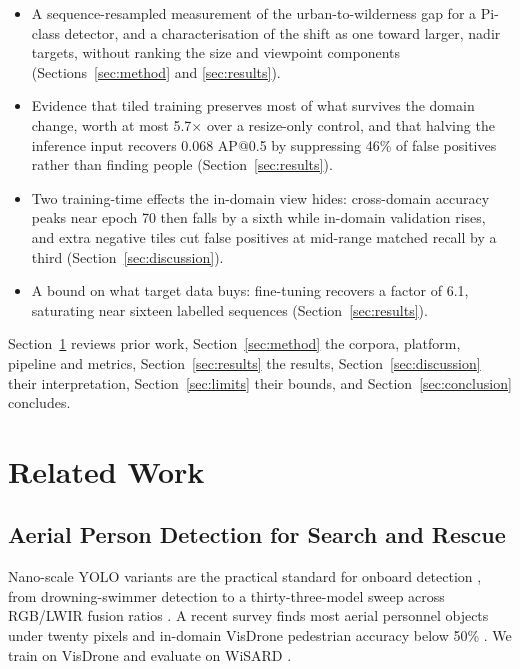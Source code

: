 \documentclass[conference]{IEEEtran}
\begin{document}
\begin{itemize}
\item A sequence-resampled measurement of the urban-to-wilderness gap for a
Pi-class detector, and a characterisation of the shift as one toward larger,
nadir targets, without ranking the size and viewpoint components
(Sections~\ref{sec:method} and \ref{sec:results}).

\item Evidence that tiled training preserves most of what survives the domain
change, worth at most 5.7$\times$ over a resize-only control, and that halving
the inference input recovers 0.068 AP@0.5 by suppressing 46\% of false
positives rather than finding people (Section~\ref{sec:results}).

\item Two training-time effects the in-domain view hides: cross-domain accuracy
peaks near epoch 70 then falls by a sixth while in-domain validation rises, and
extra negative tiles cut false positives at mid-range matched recall by a third
(Section~\ref{sec:discussion}).

\item A bound on what target data buys: fine-tuning recovers a factor of 6.1,
saturating near sixteen labelled sequences (Section~\ref{sec:results}).
\end{itemize}

Section~\ref{sec:related} reviews prior work, Section~\ref{sec:method} the
corpora, platform, pipeline and metrics, Section~\ref{sec:results} the results,
Section~\ref{sec:discussion} their interpretation, Section~\ref{sec:limits}
their bounds, and Section~\ref{sec:conclusion} concludes.

\section{Related Work}
\label{sec:related}

\subsection{Aerial Person Detection for Search and Rescue}

Nano-scale YOLO variants are the practical standard for onboard detection
\cite{humes2023,alqahtani2024}, from drowning-swimmer detection \cite{zell2026}
to a thirty-three-model sweep across RGB/LWIR fusion ratios \cite{sachdeva2025}.
A recent survey finds most aerial personnel objects under twenty pixels and
in-domain VisDrone pedestrian accuracy below 50\% \cite{zhang2025}. We train on
VisDrone \cite{zhu2021} and evaluate on WiSARD \cite{broyles2022}.
\end{document}
